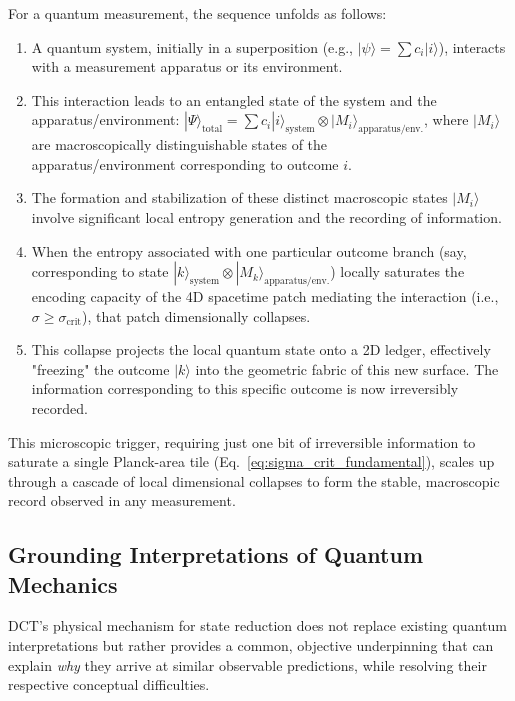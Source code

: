 \documentclass[a4paper, 12pt, oneside]{book}
\numberwithin{equation}{chapter}
\begin{document}
For a quantum measurement, the sequence unfolds as follows:
\begin{enumerate}
    \item A quantum system, initially in a superposition (e.g., $|\psi\rangle = \sum c_i |i\rangle$), interacts with a measurement apparatus or its environment.
    \item This interaction leads to an entangled state of the system and the apparatus/environment: $|\Psi\rangle_{\text{total}} = \sum c_i |i\rangle_{\text{system}} \otimes |M_i\rangle_{\text{apparatus/env.}}$, where $|M_i\rangle$ are macroscopically distinguishable states of the \\ apparatus/environment corresponding to outcome $i$.
    \item The formation and stabilization of these distinct macroscopic states $|M_i\rangle$ involve significant local entropy generation and the recording of information.
    \item When the entropy associated with one particular outcome branch (say, corresponding to state $|k\rangle_{\text{system}} \otimes |M_k\rangle_{\text{apparatus/env.}}$) locally saturates the encoding capacity of the 4D spacetime patch mediating the interaction (i.e., $\sigma \ge \sigma_{\text{crit}}$), that patch dimensionally collapses.
    \item This collapse projects the local quantum state onto a 2D ledger, effectively "freezing" the outcome $|k\rangle$ into the geometric fabric of this new surface. The information corresponding to this specific outcome is now irreversibly recorded.
\end{enumerate}

This microscopic trigger, requiring just one bit of irreversible information to saturate a single Planck-area tile (Eq.~\ref{eq:sigma_crit_fundamental}), scales up through a cascade of local dimensional collapses to form the stable, macroscopic record observed in any measurement.

\subsection[Interpretations of Quantum Mechanics]{Grounding Interpretations of Quantum Mechanics}
\label{ssec:DCTQMInterpretations}

DCT's physical mechanism for state reduction does not replace existing quantum interpretations but rather provides a common, objective underpinning that can explain \emph{why} they arrive at similar observable predictions, while resolving their respective conceptual difficulties.
\end{document}
